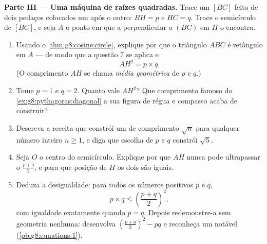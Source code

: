 \begin{problem}[{Problema de fim de semana --- a altura de um triângulo
retângulo: $AB^2 = BH \times BC$, $AH^2 = BH \times HC$, uma segunda
demonstração de Pitágoras e uma máquina de construir raízes
quadradas}]
\medskip
\noindent\textbf{Parte III --- Uma máquina de raízes quadradas.}
Trace um  $[BC]$ feito de dois pedaços colocados um após o
outro: $BH = p$ e $HC = q$. Trace o semicírculo de  $[BC]$, e
seja $A$ o ponto em que a perpendicular a $(BC)$ em $H$ o encontra.
\begin{enumerate}[resume]
  \item Usando o \cref{thm:g8:cosine:circle}, explique por que o
        triângulo $ABC$ é retângulo em $A$ --- de modo que a questão 7
        se aplica e
        \[
        AH^2 = p \times q .
        \]
        (O comprimento $AH$ se chama \emph{média
        geométrica} de $p$ e $q$.)
  \item Tome $p = 1$ e $q = 2$. Quanto vale $AH^2$? Que comprimento
        famoso do \cref{ex:g8:pythagoras:diagonal} a sua figura de
        régua e compasso acaba de construir?
  \item Descreva a receita que constrói um  de comprimento
        $\sqrt n$ para qualquer número inteiro $n \geq 1$, e diga que
        escolha de $p$ e $q$ constrói $\sqrt 5$.
  \item Seja $O$ o centro do semicírculo. Explique por que $AH$ nunca
        pode ultrapassar o  $\frac{p + q}{2}$, e para que posição
        de $H$ os dois são iguais.
  \item Deduza a desigualdade: para todos os números positivos $p$ e
        $q$,
        \[
        p \times q \leq \left(\frac{p + q}{2}\right)^2,
        \]
        com igualdade exatamente quando $p = q$. Depois redemonstre-a
        sem geometria nenhuma: desenvolva
        $\left(\frac{p+q}{2}\right)^2 - p q$ e reconheça um 
        notável (\cref{pb:g8:equations:1}).
\end{enumerate}
\end{problem}
